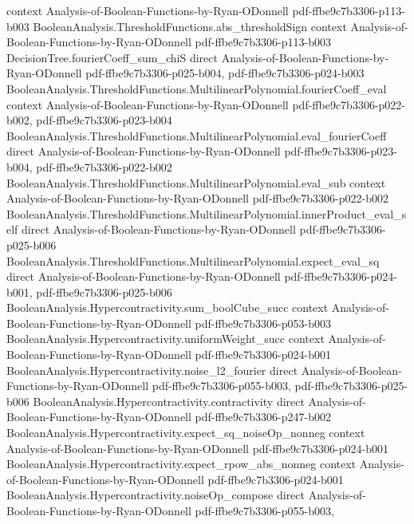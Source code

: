 \begin{theorem}
  {context}
  {Analysis-of-Boolean-Functions-by-Ryan-ODonnell}
  {pdf-ffbe9c7b3306-p113-b003}
\proofstep
  {BooleanAnalysis.ThresholdFunctions.abs_thresholdSign}
  {context}
  {Analysis-of-Boolean-Functions-by-Ryan-ODonnell}
  {pdf-ffbe9c7b3306-p113-b003}
\proofstep
  {DecisionTree.fourierCoeff_sum_chiS}
  {direct}
  {Analysis-of-Boolean-Functions-by-Ryan-ODonnell}
  {pdf-ffbe9c7b3306-p025-b004,
    pdf-ffbe9c7b3306-p024-b003}
\proofstep
  {BooleanAnalysis.ThresholdFunctions.MultilinearPolynomial.fourierCoeff_eval}
  {context}
  {Analysis-of-Boolean-Functions-by-Ryan-ODonnell}
  {pdf-ffbe9c7b3306-p022-b002,
    pdf-ffbe9c7b3306-p023-b004}
\proofstep
  {BooleanAnalysis.ThresholdFunctions.MultilinearPolynomial.eval_fourierCoeff}
  {direct}
  {Analysis-of-Boolean-Functions-by-Ryan-ODonnell}
  {pdf-ffbe9c7b3306-p023-b004,
    pdf-ffbe9c7b3306-p022-b002}
\proofstep
  {BooleanAnalysis.ThresholdFunctions.MultilinearPolynomial.eval_sub}
  {context}
  {Analysis-of-Boolean-Functions-by-Ryan-ODonnell}
  {pdf-ffbe9c7b3306-p022-b002}
\proofstep
  {BooleanAnalysis.ThresholdFunctions.MultilinearPolynomial.innerProduct_eval_self}
  {direct}
  {Analysis-of-Boolean-Functions-by-Ryan-ODonnell}
  {pdf-ffbe9c7b3306-p025-b006}
\proofstep
  {BooleanAnalysis.ThresholdFunctions.MultilinearPolynomial.expect_eval_sq}
  {direct}
  {Analysis-of-Boolean-Functions-by-Ryan-ODonnell}
  {pdf-ffbe9c7b3306-p024-b001,
    pdf-ffbe9c7b3306-p025-b006}
\proofstep
  {BooleanAnalysis.Hypercontractivity.sum_boolCube_succ}
  {context}
  {Analysis-of-Boolean-Functions-by-Ryan-ODonnell}
  {pdf-ffbe9c7b3306-p053-b003}
\proofstep
  {BooleanAnalysis.Hypercontractivity.uniformWeight_succ}
  {context}
  {Analysis-of-Boolean-Functions-by-Ryan-ODonnell}
  {pdf-ffbe9c7b3306-p024-b001}
\proofstep
  {BooleanAnalysis.Hypercontractivity.noise_l2_fourier}
  {direct}
  {Analysis-of-Boolean-Functions-by-Ryan-ODonnell}
  {pdf-ffbe9c7b3306-p055-b003,
    pdf-ffbe9c7b3306-p025-b006}
\proofstep
  {BooleanAnalysis.Hypercontractivity.contractivity}
  {direct}
  {Analysis-of-Boolean-Functions-by-Ryan-ODonnell}
  {pdf-ffbe9c7b3306-p247-b002}
\proofstep
  {BooleanAnalysis.Hypercontractivity.expect_sq_noiseOp_nonneg}
  {context}
  {Analysis-of-Boolean-Functions-by-Ryan-ODonnell}
  {pdf-ffbe9c7b3306-p024-b001}
\proofstep
  {BooleanAnalysis.Hypercontractivity.expect_rpow_abs_nonneg}
  {context}
  {Analysis-of-Boolean-Functions-by-Ryan-ODonnell}
  {pdf-ffbe9c7b3306-p024-b001}
\proofstep
  {BooleanAnalysis.Hypercontractivity.noiseOp_compose}
  {direct}
  {Analysis-of-Boolean-Functions-by-Ryan-ODonnell}
  {pdf-ffbe9c7b3306-p055-b003,
}
\end{theorem}
